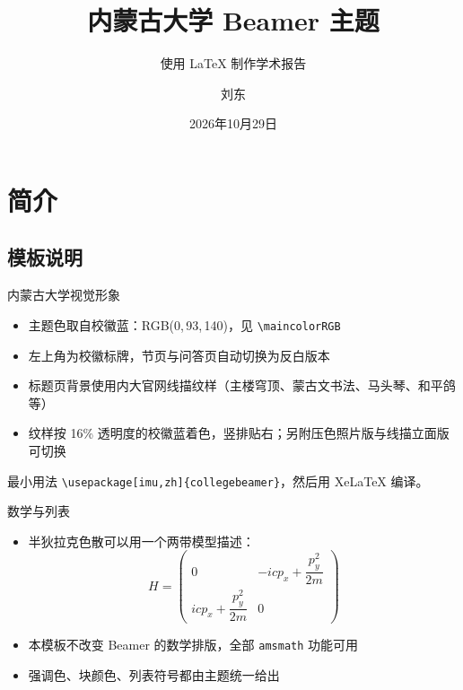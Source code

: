 \documentclass[aspectratio=169]{beamer}
\title{内蒙古大学 Beamer 主题}
\subtitle{使用 \LaTeX{} 制作学术报告}
\author{刘东}
\institute{内蒙古大学}
\date{2026年10月29日}
\begin{document}
\maketitle

\section{简介}
\subsection{模板说明}

\begin{frame}[fragile]{内蒙古大学视觉形象}
    \begin{itemize}
        \item 主题色取自校徽蓝：RGB(0,\,93,\,140)，见 \verb|\maincolorRGB|
        \item 左上角为校徽标牌，节页与问答页自动切换为反白版本
        \item 标题页背景使用内大官网线描纹样（主楼穹顶、蒙古文书法、马头琴、和平鸽等）
        \item 纹样按 16\% 透明度的校徽蓝着色，竖排贴右；另附压色照片版与线描立面版可切换
    \end{itemize}
    \vspace{1em}
    \begin{block}{最小用法}
        \verb|\usepackage[imu,zh]{collegebeamer}|，然后用 XeLaTeX 编译。
    \end{block}
\end{frame}

\begin{frame}[fragile]{数学与列表}
    \begin{itemize}
        \item 半狄拉克色散可以用一个两带模型描述：
              \begin{equation*}
                  H = \begin{pmatrix}
                      0 & -icp_x + \dfrac{p_y^2}{2m} \\[2mm]
                      icp_x + \dfrac{p_y^2}{2m} & 0
                  \end{pmatrix}
              \end{equation*}
        \item 本模板不改变 Beamer 的数学排版，全部 \verb|amsmath| 功能可用
        \item 强调色、块颜色、列表符号都由主题统一给出
    \end{itemize}
\end{frame}
\end{document}
